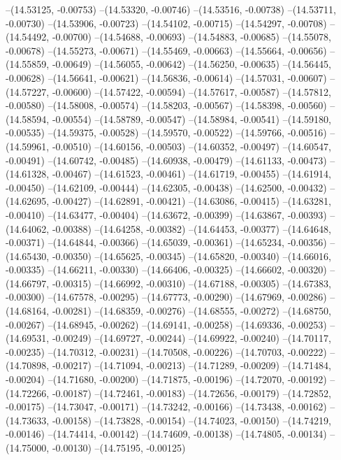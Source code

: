 --(14.53125, -0.00753)
--(14.53320, -0.00746)
--(14.53516, -0.00738)
--(14.53711, -0.00730)
--(14.53906, -0.00723)
--(14.54102, -0.00715)
--(14.54297, -0.00708)
--(14.54492, -0.00700)
--(14.54688, -0.00693)
--(14.54883, -0.00685)
--(14.55078, -0.00678)
--(14.55273, -0.00671)
--(14.55469, -0.00663)
--(14.55664, -0.00656)
--(14.55859, -0.00649)
--(14.56055, -0.00642)
--(14.56250, -0.00635)
--(14.56445, -0.00628)
--(14.56641, -0.00621)
--(14.56836, -0.00614)
--(14.57031, -0.00607)
--(14.57227, -0.00600)
--(14.57422, -0.00594)
--(14.57617, -0.00587)
--(14.57812, -0.00580)
--(14.58008, -0.00574)
--(14.58203, -0.00567)
--(14.58398, -0.00560)
--(14.58594, -0.00554)
--(14.58789, -0.00547)
--(14.58984, -0.00541)
--(14.59180, -0.00535)
--(14.59375, -0.00528)
--(14.59570, -0.00522)
--(14.59766, -0.00516)
--(14.59961, -0.00510)
--(14.60156, -0.00503)
--(14.60352, -0.00497)
--(14.60547, -0.00491)
--(14.60742, -0.00485)
--(14.60938, -0.00479)
--(14.61133, -0.00473)
--(14.61328, -0.00467)
--(14.61523, -0.00461)
--(14.61719, -0.00455)
--(14.61914, -0.00450)
--(14.62109, -0.00444)
--(14.62305, -0.00438)
--(14.62500, -0.00432)
--(14.62695, -0.00427)
--(14.62891, -0.00421)
--(14.63086, -0.00415)
--(14.63281, -0.00410)
--(14.63477, -0.00404)
--(14.63672, -0.00399)
--(14.63867, -0.00393)
--(14.64062, -0.00388)
--(14.64258, -0.00382)
--(14.64453, -0.00377)
--(14.64648, -0.00371)
--(14.64844, -0.00366)
--(14.65039, -0.00361)
--(14.65234, -0.00356)
--(14.65430, -0.00350)
--(14.65625, -0.00345)
--(14.65820, -0.00340)
--(14.66016, -0.00335)
--(14.66211, -0.00330)
--(14.66406, -0.00325)
--(14.66602, -0.00320)
--(14.66797, -0.00315)
--(14.66992, -0.00310)
--(14.67188, -0.00305)
--(14.67383, -0.00300)
--(14.67578, -0.00295)
--(14.67773, -0.00290)
--(14.67969, -0.00286)
--(14.68164, -0.00281)
--(14.68359, -0.00276)
--(14.68555, -0.00272)
--(14.68750, -0.00267)
--(14.68945, -0.00262)
--(14.69141, -0.00258)
--(14.69336, -0.00253)
--(14.69531, -0.00249)
--(14.69727, -0.00244)
--(14.69922, -0.00240)
--(14.70117, -0.00235)
--(14.70312, -0.00231)
--(14.70508, -0.00226)
--(14.70703, -0.00222)
--(14.70898, -0.00217)
--(14.71094, -0.00213)
--(14.71289, -0.00209)
--(14.71484, -0.00204)
--(14.71680, -0.00200)
--(14.71875, -0.00196)
--(14.72070, -0.00192)
--(14.72266, -0.00187)
--(14.72461, -0.00183)
--(14.72656, -0.00179)
--(14.72852, -0.00175)
--(14.73047, -0.00171)
--(14.73242, -0.00166)
--(14.73438, -0.00162)
--(14.73633, -0.00158)
--(14.73828, -0.00154)
--(14.74023, -0.00150)
--(14.74219, -0.00146)
--(14.74414, -0.00142)
--(14.74609, -0.00138)
--(14.74805, -0.00134)
--(14.75000, -0.00130)
--(14.75195, -0.00125)
